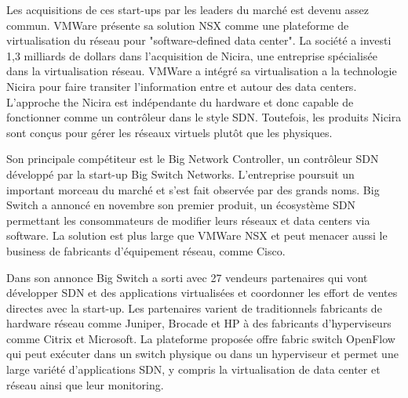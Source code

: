 


Les acquisitions de ces start-ups par les leaders du marché est devenu assez commun. VMWare présente sa solution NSX comme une plateforme de virtualisation du réseau pour "software-defined data center". La société a investi 1,3 milliards de dollars dans l'acquisition de Nicira, une entreprise spécialisée dans la virtualisation réseau.
VMWare a intégré sa virtualisation a la technologie Nicira pour faire transiter l'information entre et autour des data centers. L'approche the Nicira est indépendante du hardware et donc capable de fonctionner comme un contrôleur dans le style SDN. Toutefois, les produits Nicira sont conçus pour gérer les réseaux virtuels plutôt que les physiques. \cite{ExecutiveGuideToSDNBigSwitch}


Son principale compétiteur est le Big Network Controller, un contrôleur SDN développé par la start-up Big Switch Networks. L'entreprise poursuit un important morceau du marché et s'est fait observée par des grands noms. Big Switch a annoncé en novembre son premier produit, un écosystème SDN permettant les consommateurs de modifier leurs réseaux et data centers via software. La solution est plus large que VMWare NSX et peut menacer aussi le business de fabricants d'équipement réseau, comme Cisco. \cite{BigSwitchLaunchesFirst}


Dans son annonce Big Switch a sorti avec 27 vendeurs partenaires qui vont développer SDN et des applications virtualisées et coordonner les effort de ventes directes avec la start-up. Les partenaires varient de traditionnels fabricants de hardware réseau comme Juniper, Brocade et HP à des fabricants d'hyperviseurs comme Citrix et Microsoft. La plateforme proposée offre \gls{fabric} switch OpenFlow qui peut exécuter dans un switch physique ou dans un hyperviseur et permet une large variété d'applications SDN, y compris la virtualisation de data center et réseau ainsi que leur monitoring. \cite{BigSwitchAnnouncement}

